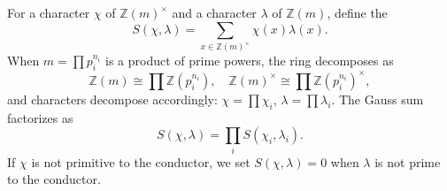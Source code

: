 For a character $\chi$ of $\mathbb{Z}(m)^\times$ and a character $\lambda$ of $\mathbb{Z}(m)$, define the 
$$
S(\chi, \lambda) = \sum_{x \in \mathbb{Z}(m)^\times} \chi(x) \lambda(x).
$$
When $m = \prod p_i^{n_i}$ is a product of prime powers, the ring decomposes as
$$
\mathbb{Z}(m) \cong \prod \mathbb{Z}(p_i^{n_i}), \quad \mathbb{Z}(m)^\times \cong \prod \mathbb{Z}(p_i^{n_i})^\times,
$$
and characters decompose accordingly: $\chi = \prod \chi_i$, $\lambda = \prod \lambda_i$. The Gauss sum factorizes as
$$
S(\chi, \lambda) = \prod_i S(\chi_i, \lambda_i).
$$
If $\chi$ is not primitive to the conductor, we set $S(\chi, \lambda) = 0$ when $\lambda$ is not prime to the conductor.
